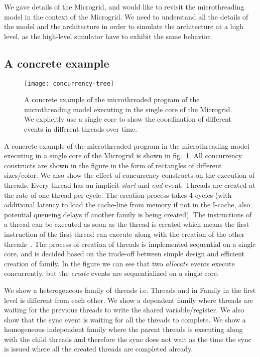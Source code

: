\documentclass{article}
\begin{document}
We gave details of the Microgrid, and would like to revisit the microthreading
model in the context of the Microgrid. We need to understand all the details of
the model and the architecture in order to simulate the architecture at a
high level, as the high-level simulator have to exhibit the same behavior.

\subsection{A concrete example}

\begin{figure}

\begin{centering}

\texttt{[image: concurrency-tree]}

\caption{\label{fig:concurrency_tree}A concrete example of the microthreaded
program of the microthreading model executing in the single core of the
Microgrid. We explicitly use a single core to show the coordination of
different events in different threads over time.}

\end{centering}

\end{figure}

A concrete example of the microthreaded program in the microthreading model
executing in a single core of the Microgrid is shown
in fig.~\ref{fig:concurrency_tree}. All concurrency constructs are shown in the
figure in the form of rectangles of different sizes/color. We also show the
effect of concurrency constructs on the execution of threads. Every thread has
an implicit \emph{start} and \emph{end} event. Threads are created at the rate
of one thread per cycle. The creation process takes 4 cycles (with additional
latency to load the cache-line from memory if not in the I-cache, also
potential queueing delays if another family is being created). The instructions
of a thread can be executed as soon as the thread is created which means the
first instruction of the first thread can execute along with the creation of
the other threads~\cite{mike.12}. The process of creation of threads is
implemented sequential on a single core, and is decided based on the trade-off
between simple design and efficient creation of family. In the figure we can
see that two \emph{allocate} events execute concurrently, but the \emph{create}
events are sequentialized on a single core.

We show a heterogeneous family of threads i.e. Threads  and  in Family
 in the first level is different from each other. We show a dependent family
where threads are waiting for the previous threads to write the shared
variable/register. We also show that the sync event is waiting for all the
threads to complete. We show a homogeneous independent family where the parent
threads is executing along with the child threads and therefore the sync does
not wait as the time the sync is issued where all the created threads are
completed already.
\end{document}
